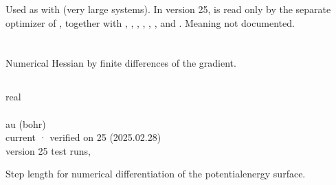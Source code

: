 \documentclass[letterpaper,10pt,english,openany,oneside]{sphinxmanual}
\begin{document}
\sphinxAtStartPar
Used as  with  (very large systems). In version 25,  is read only by the separate
optimizer of , together with , , , , , ,
 and . Meaning not documented.

\sphinxstepscope




\section{}
\label{\detokenize{reference/d2edr2:d2edr2}}\label{\detokenize{reference/d2edr2:group-d2edr2}}\label{\detokenize{reference/d2edr2::doc}}
\ignorespaces 
\sphinxAtStartPar
Numerical Hessian by finite differences of the gradient.

\sphinxAtStartPar
{} 


\subsection{}
\label{\detokenize{reference/d2edr2:length}}\label{\detokenize{reference/d2edr2:d2edr2-length}}
\ignorespaces 
\sphinxAtStartPar
{} real\\
 \\
 au (bohr)\\
 current · verified on 25 (2025.02.28)\\
 version 25 test runs, 

\sphinxAtStartPar
Step length for numerical differentiation of the potential\sphinxhyphen{}energy surface.
\end{document}
